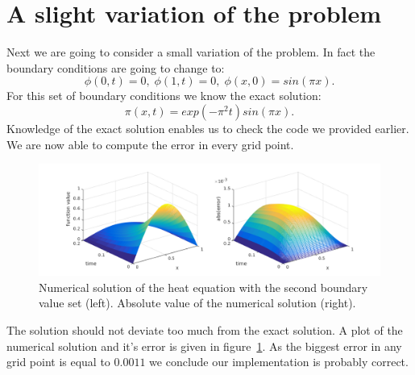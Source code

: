 \documentclass[ twoside,openright,titlepage,numbers=noenddot,headinclude,%
                footinclude=true,cleardoublepage=empty,abstractoff, %
                BCOR=5mm,paper=a4,fontsize=11pt,%
                ngerman,american,%
                ]{scrreprt}
\begin{document}
\section{A slight variation of the problem}
Next we are going to consider a small variation of the problem. In fact the boundary conditions are going to change to:
\begin{equation*}
\phi(0,t) = 0, \; \phi(1,t) = 0, \; \phi(x,0) = sin(\pi x).
\end{equation*} 
For this set of boundary conditions we know the exact solution:
\begin{equation}
\pi(x,t) = exp(-\pi^2 t)sin(\pi x).
\end{equation}
Knowledge of the exact solution enables us to check the code we provided earlier. We are now able to compute the error in every grid point.
\begin{figure}
\includegraphics[scale = 0.45]{images/explicitEulerError.png}
\caption{Numerical solution of the heat equation with the second boundary value set (left). Absolute value of the numerical solution (right).}
\label{fig:errorExpEuler}
\end{figure}
 The solution should not deviate too much from the exact solution. A plot of the numerical solution and it's error is given in figure~\ref{fig:errorExpEuler}. As the biggest error in any grid point is equal to $0.0011$ we conclude our implementation is probably correct.
  
\end{document}
